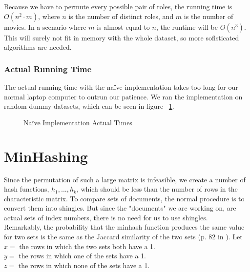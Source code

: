\documentclass[a4paper,11pt]{article}
\begin{document}
Because we have to permute every possible pair of roles, the running time is $O(n^2 \cdot m)$, where $n$ is the number of distinct roles, and $m$ is the number of movies. In a scenario where $m$ is almost equal to $n$, the runtime will be $O(n^3)$. \\

This will surely not fit in memory with the whole dataset, so more sofisticated algorithms are needed. \\

\subsubsection{Actual Running Time}
The actual running time with the naïve implementation takes too long for our normal laptop computer to outrun our patience. We ran the implementation on random dummy datasets, which can be seen in figure ~\ref{fig:naive_at}.

\begin{figure}[!htbp]
    \begin{center}
        
        \caption{Naïve Implementation Actual Times}
        \label{fig:naive_at}
    \end{center}
\end{figure}


\section{MinHashing}
Since the permutation of such a large matrix is infeasible, we create a number of hash functions, $h_1, ..., h_k$, which should be less than the number of rows in the characteristic matrix. To compare sets of documents, the normal procedure is to convert them into shingles. But since the "documents" we are working on, are actual sets of index numbers, there is no need for us to use shingles. \\

Remarkably, the probability that the minhash function produces the same value for two sets is the same as the Jaccard similarity of the two sets (p. 82 in \cite{book:mmds}). Let \\

    $x = $ the rows in which the two sets both have a 1. \\
    $y = $ the rows in which one of the sets have a 1. \\
    $z = $ the rows in which none of the sets have a 1. \\
\end{document}
